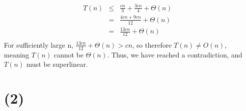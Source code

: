 \documentclass[12pt]{article}
\begin{document}
\begin{enumerate}[label=(\alph*)]
  \begin{eqnarray*}
  T(n) &\le& \frac{cn}{3} + \frac{3cn}{4} + \Theta(n)\\
  &=& \frac{4cn + 9cn}{12} + \Theta(n)\\
  &=& \frac{13cn}{12} + \Theta(n)\\
  \end{eqnarray*}
  For sufficiently large n, $\frac{13cn}{12} + \Theta(n) > cn$, so therefore $T(n) \ne O(n)$, meaning $T(n)$ cannot be $\Theta(n)$. Thus, we have reached a contradiction, and $T(n)$ must be superlinear.
\end{enumerate}

\section*{(2)}
\end{document}
